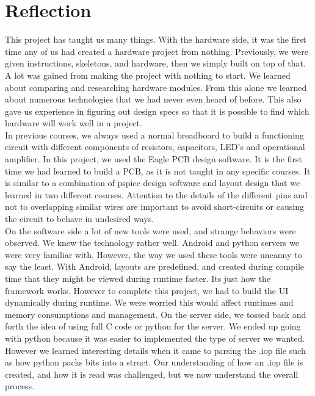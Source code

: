 \documentclass[paper=a4, fontsize=11pt]{scrartcl}
\numberwithin{equation}{section}		%
\numberwithin{figure}{section}			%
\numberwithin{table}{section}				%
\begin{document}
\pagebreak
\section{Reflection}
This project has taught us many things. With the hardware side, it was the first time any of us had created a hardware project from nothing. Previously, we were given instructions, skeletons, and hardware, then we simply built on top of that. A lot was gained from making the project with nothing to start. We learned about comparing and researching hardware modules. From this alone we learned about numerous technologies that we had never even heard of before. This also gave us experience in figuring out design specs so that it is possible to find which hardware will work well in a project.\\

In previous courses, we always used a normal breadboard to build a functioning circuit with different components of resistors, capacitors, LED's and operational amplifier. In this project, we used the Eagle PCB design software. It is the first time we had learned to build a PCB, as it is not taught in any specific courses. It is similar to a combination of pspice design software and layout design that we learned in two different courses. Attention to the details of the different pins and not to overlapping similar wires are important to avoid short-circuits or causing the circuit to behave in undesired ways.\\

On the software side a lot of new tools were used, and strange behaviors were observed. We knew the technology rather well. Android and python servers we were very familiar with. However, the way we used these tools were uncanny to say the least. With Android, layouts are predefined, and created during compile time that they might be viewed during runtime faster. Its just how the framework works. However to complete this project, we had to build the UI dynamically during runtime. We were worried this would affect runtimes and memory consumptions and management. On the server side, we tossed back and forth the idea of using full C code or python for the server. We ended up going with python because it was easier to implemented the type of server we wanted. However we learned interesting details when it came to parsing the .iop file such as how python packs bits into a struct. Our understanding of how an .iop file is created, and how it is read was challenged, but we now understand the overall process.\\
\end{document}
